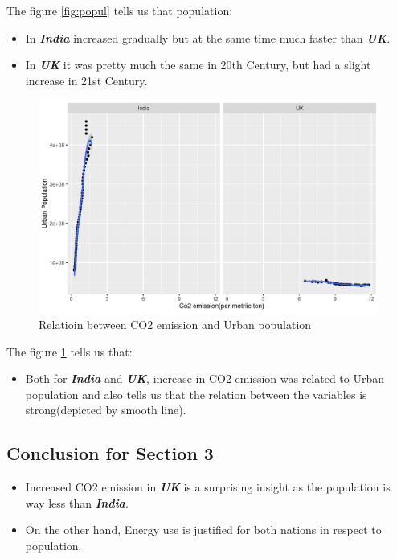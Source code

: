 \documentclass[11pt,a4paper,]{article}
\providecommand{\tightlist}{%
  \setlength{\itemsep}{0pt}\setlength{\parskip}{0pt}}
\begin{document}
The figure \ref{fig:popul} tells us that population:

\begin{itemize}
\tightlist
\item
  In \textbf{\emph{India}} increased gradually but at the same time much faster than \textbf{\emph{UK}}.
\item
  In \textbf{\emph{UK}} it was pretty much the same in 20th Century, but had a slight increase in 21st Century.
\end{itemize}

\clearpage 
\begin{figure}

{\centering \includegraphics[width=0.9\linewidth]{Figures/rel-co2-pop-1} 

}

\caption{Relatioin between CO2 emission and Urban population}\label{fig:rel-co2-pop}
\end{figure}

The figure \ref{fig:rel-co2-pop} tells us that:

\begin{itemize}
\tightlist
\item
  Both for \textbf{\emph{India}} and \textbf{\emph{UK}}, increase in CO2 emission was related to Urban population and also tells us that the relation between the variables is strong(depicted by smooth line).
\end{itemize}

\hypertarget{conclusion-for-section-3}{%
\subsection{Conclusion for Section 3}\label{conclusion-for-section-3}}

\begin{itemize}
\tightlist
\item
  Increased CO2 emission in \textbf{\emph{UK}} is a surprising insight as the population is way less than \textbf{\emph{India}}.
\item
  On the other hand, Energy use is justified for both nations in respect to population.
\end{itemize}

\clearpage

\printbibliography
\end{document}
